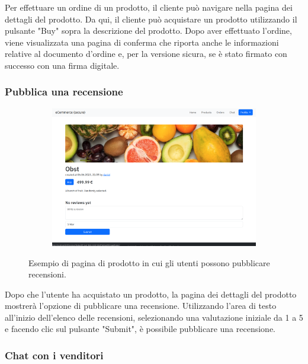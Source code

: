 \documentclass[conference,onecolumn,a4paper]{IEEEtran}
\begin{document}
{Per effettuare un ordine di un prodotto, il cliente può navigare nella pagina dei dettagli del prodotto. Da qui, il cliente può acquistare un prodotto utilizzando il pulsante "Buy" sopra la descrizione del prodotto. Dopo aver effettuato l'ordine, viene visualizzata una pagina di conferma che riporta anche le informazioni relative al documento d'ordine e, per la versione sicura, se è stato firmato con successo con una firma digitale.

\subsubsection{Pubblica una recensione}

\begin{figure}[H]
    \centering
    \begin{subfigure}[b]{0.4\linewidth}
        \includegraphics[width=\linewidth]{resources/product-customer.png}
    \end{subfigure}
    \caption{Esempio di pagina di prodotto in cui gli utenti possono pubblicare recensioni.}
\end{figure}

Dopo che l'utente ha acquistato un prodotto, la pagina dei dettagli del prodotto mostrerà l'opzione di pubblicare una recensione. Utilizzando l'area di testo all'inizio dell'elenco delle recensioni, selezionando una valutazione iniziale da 1 a 5 e facendo clic sul pulsante "Submit", è possibile pubblicare una recensione.

\subsubsection{Chat con i venditori}

}
\end{document}

